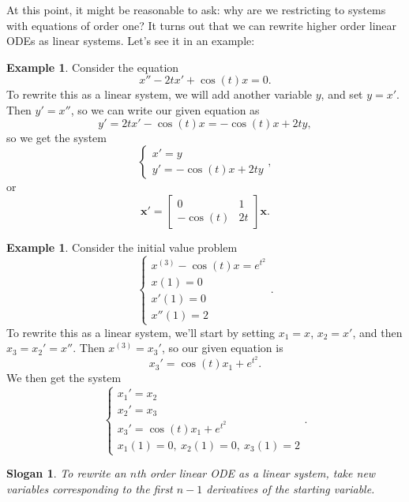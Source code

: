 \documentclass[12pt]{amsart}
\numberwithin{equation}{section}
\theoremstyle{plain} %
\newtheorem{slogan}[equation]{Slogan}
\theoremstyle{definition}
\newtheorem{ex}[equation]{Example}
\theoremstyle{remark}
\begin{document}
At this point, it might be reasonable to ask: why are we restricting to systems with equations of order one? It turns out that we can rewrite higher order linear ODEs as linear systems. Let's see it in an example:

\begin{ex}
Consider the equation
\[ x'' - 2 t x' + \cos(t) x = 0.\]
To rewrite this as a linear system, we will add another variable $y$, and set $y=x'$. Then $y'=x''$, so we can write our given equation as
\[ y' = 2tx' - \cos(t) x = -\cos(t) x + 2t y,\]
so we get the system
\[ \begin{cases} x' = y \\ y' = - \cos(t) x + 2t y\end{cases},\]
or
\[  \mathbf{x'} = \begin{bmatrix} 0 & 1 \\ -\cos(t) & 2t \end{bmatrix} \mathbf{x}.\]
\end{ex}


\begin{ex}
Consider the initial value problem 
\[ \begin{cases} x^{(3)} - \cos(t) x = e^{t^2}\\
x(1) = 0 \\
x'(1) = 0 \\
x''(1) = 2\end{cases}.\]
To rewrite this as a linear system, we'll start by setting $x_1=x$, $x_2=x'$, and then $x_3=x_2' = x''$.
Then $x^{(3)} = x_3'$, so our given equation is
\[ x_3' = \cos(t) x_1 + e^{t^2}.\]
We then get the system
\[ \begin{cases}
x_1' = x_2\\
x_2' = x_3\\
x_3' =\cos(t) x_1 + e^{t^2} \\
x_1(1) = 0 , \ x_2(1) =0 , \ x_3(1) = 2\end{cases}.\]
\end{ex}

\begin{slogan}
To rewrite an $n$th order linear ODE as a linear system, take new variables corresponding to the first $n-1$ derivatives of the starting variable.
\end{slogan}

\end{document}
